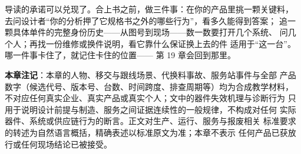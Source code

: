 导读的承诺可以兑现了。合上书之前，做三件事：在你的产品里挑一颗关键料，
去问设计者“你的分析押了它规格书之外的哪些行为”，看多久能得到答案；
追一颗具体单件的完整身份历史——从图号到现场——数一数要打开几个系统、
问几个人；再找一份维修或换件说明，看它靠什么保证换上去的件
适用于“这一台”。哪一件事卡住了，就记住卡住的位置——
第 19 章会回到那里。


\begin{noteblock}
\textbf{本章注记}：本章的人物、移交与跟线场景、代换料事故、服务站事件与全部
产品数字（候选代号、版本号、台数、时间跨度、排查周期等）均为合成教学材料，
不对应任何真实企业、真实产品或真实个人；文中的器件失效机理与诊断行为
只用于说明设计前提与制造、服务之间证据连续性的一般规律，不构成对任何
实际器件、系统或供应链行为的断言。正文对生产、运行、服务与报废相关
标准要求的转述为自然语言概括，精确表述以标准原文为准；本章不表示
任何产品已获放行或任何现场结论已被接受。
\end{noteblock}
